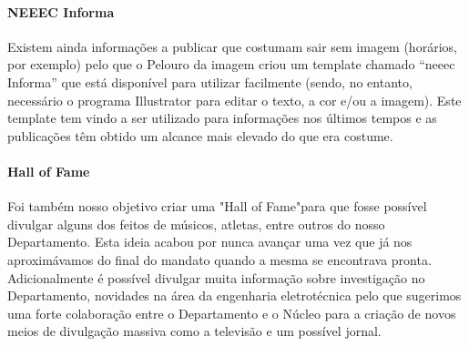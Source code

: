 \paragraph{NEEEC Informa}
Existem ainda informações a publicar que costumam sair sem imagem (horários, por exemplo) pelo que o Pelouro da imagem criou um template chamado “\acrshort{neeec} Informa” que está disponível para utilizar facilmente (sendo, no entanto, necessário o programa Illustrator para editar o texto, a cor e/ou a imagem). Este template tem vindo a ser utilizado para informações nos últimos tempos e as publicações têm obtido um alcance mais elevado do que era costume.

\paragraph{Hall of Fame}
Foi também nosso objetivo criar uma "Hall of Fame"\space para que fosse possível divulgar alguns dos feitos de músicos, atletas, entre outros do nosso Departamento. Esta ideia acabou por nunca avançar uma vez que já nos aproximávamos do final do mandato quando a mesma se encontrava pronta. Adicionalmente é possível divulgar muita informação sobre investigação no Departamento, novidades na área da engenharia eletrotécnica pelo que sugerimos uma forte colaboração entre o Departamento e o Núcleo para a criação de novos meios de divulgação massiva como a televisão e um possível jornal.





